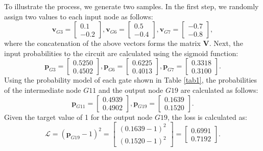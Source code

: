 To illustrate the process, we generate two samples. In the first step, we randomly assign two values to each input node as follows:
\begin{equation}
    \textbf{v}_{G3} = \begin{bmatrix}
           0.1 \\
           -0.2 
         \end{bmatrix}, \textbf{v}_{G6} = \begin{bmatrix}
           0.5 \\
           -0.4 
         \end{bmatrix}, \textbf{v}_{G7} = \begin{bmatrix}
           -0.7 \\
           -0.8 
         \end{bmatrix},
\end{equation}
where the concatenation of the above vectors forms the matrix $\textbf{V}$. Next, the input probabilities to the circuit are calculated using the sigmoid function:
\begin{equation}
    \textbf{p}_{G3} = \begin{bmatrix}
           0.5250 \\
           0.4502
         \end{bmatrix}, \textbf{p}_{G6} = \begin{bmatrix}
           0.6225 \\
           0.4013
         \end{bmatrix}, \textbf{p}_{G7} = \begin{bmatrix}
           0.3318 \\
           0.3100
         \end{bmatrix}.
\end{equation}
Using the probability model of each gate shown in Table \ref{tab1}, the probabilities of the intermediate node $G11$ and the output node $G19$ are calculated as follows:
\begin{equation}
    \textbf{p}_{G11} = \begin{bmatrix}
           0.4939 \\
           0.4902
         \end{bmatrix}, \textbf{p}_{G19} = \begin{bmatrix}
           0.1639 \\
           0.1520
         \end{bmatrix}.
\end{equation}
Given the target value of 1 for the output node $G19$, the loss is calculated as:
\begin{equation}
    \mathcal{L} = (\textbf{p}_{G19} - 1)^2 = \begin{bmatrix}
           (0.1639 - 1)^2  \\
           (0.1520 - 1)^2 
         \end{bmatrix} = \begin{bmatrix}
           0.6991  \\
           0.7192 
         \end{bmatrix}.
\end{equation}


